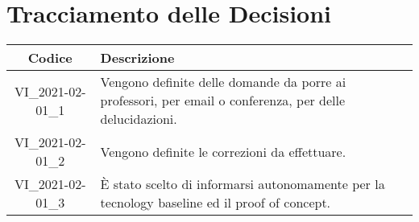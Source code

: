 \section*{Tracciamento delle Decisioni}

\begin{center}
	\begin{longtable}{|c|p{13cm}|}
	\hline
	\rowcolor{lighter-grayer}
	\textbf{Codice} & \textbf{Descrizione} \\
	\hline
	\endfirsthead

	\hline
	VI\_2021-02-01\_1 & Vengono definite delle domande da porre ai professori, per email o conferenza, per delle delucidazioni. \\
	\hline
	VI\_2021-02-01\_2 & Vengono definite le correzioni da effettuare. \\
	VI\_2021-02-01\_3 & È stato scelto di informarsi autonomamente per la tecnology baseline ed il proof of concept. \\
	\hline

	\end{longtable}
\end{center}